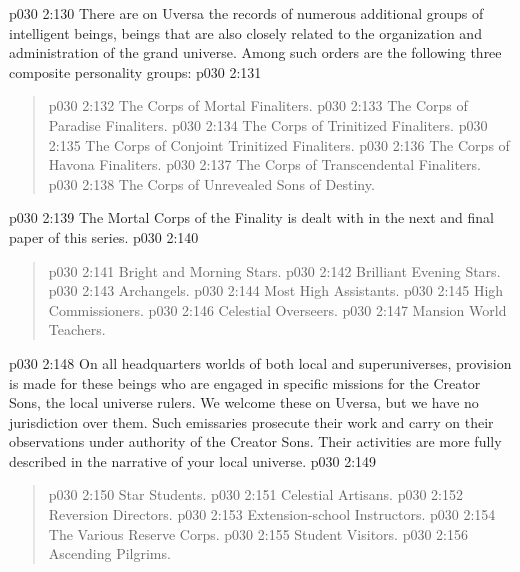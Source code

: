 \vsetspace
\vs p030 2:130 \pc {} There are on Uversa the records of numerous additional groups of intelligent beings, beings that are also closely related to the organization and administration of the grand universe. Among such orders are the following three composite personality groups:
\vsetspace
\vs p030 2:131 \bibnobreakspace {}
\begin{quote}
\vs p030 2:132 \bibnobreakspace The Corps of Mortal Finaliters.
\vs p030 2:133 \bibnobreakspace The Corps of Paradise Finaliters.
\vs p030 2:134 \bibnobreakspace The Corps of Trinitized Finaliters.
\vs p030 2:135 \bibnobreakspace The Corps of Conjoint Trinitized Finaliters.
\vs p030 2:136 \bibnobreakspace The Corps of Havona Finaliters.
\vs p030 2:137 \bibnobreakspace The Corps of Transcendental Finaliters.
\vs p030 2:138 \bibnobreakspace The Corps of Unrevealed Sons of Destiny.
\end{quote}
\vs p030 2:139 \pc The Mortal Corps of the Finality is dealt with in the next and final paper of this series.
\vsetspace
\vs p030 2:140 \bibnobreakspace {}
\begin{quote}
\vs p030 2:141 \bibnobreakspace Bright and Morning Stars.
\vs p030 2:142 \bibnobreakspace Brilliant Evening Stars.
\vs p030 2:143 \bibnobreakspace Archangels.
\vs p030 2:144 \bibnobreakspace Most High Assistants.
\vs p030 2:145 \bibnobreakspace High Commissioners.
\vs p030 2:146 \bibnobreakspace Celestial Overseers.
\vs p030 2:147 \bibnobreakspace Mansion World Teachers.
\end{quote}
\vs p030 2:148 \pc On all headquarters worlds of both local and superuniverses, provision is made for these beings who are engaged in specific missions for the Creator Sons, the local universe rulers. We welcome these  on Uversa, but we have no jurisdiction over them. Such emissaries prosecute their work and carry on their observations under authority of the Creator Sons. Their activities are more fully described in the narrative of your local universe.
\vsetspace
\vs p030 2:149 \bibnobreakspace {}
\begin{quote}
\vs p030 2:150 \bibnobreakspace Star Students.
\vs p030 2:151 \bibnobreakspace Celestial Artisans.
\vs p030 2:152 \bibnobreakspace Reversion Directors.
\vs p030 2:153 \bibnobreakspace Extension\hyp{}school Instructors.
\vs p030 2:154 \bibnobreakspace The Various Reserve Corps.
\vs p030 2:155 \bibnobreakspace Student Visitors.
\vs p030 2:156 \bibnobreakspace Ascending Pilgrims.
\end{quote}
